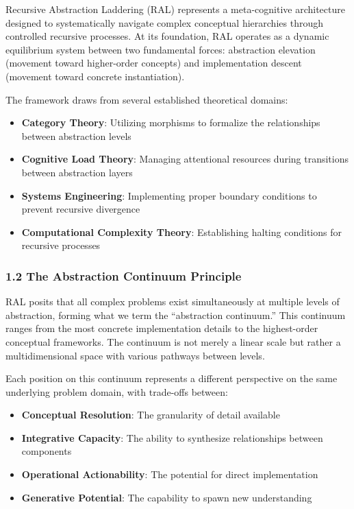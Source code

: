 \documentclass[
]{article}
\providecommand{\tightlist}{%
  \setlength{\itemsep}{0pt}\setlength{\parskip}{0pt}}
\begin{document}
Recursive Abstraction Laddering (RAL) represents a meta-cognitive
architecture designed to systematically navigate complex conceptual
hierarchies through controlled recursive processes. At its foundation,
RAL operates as a dynamic equilibrium system between two fundamental
forces: abstraction elevation (movement toward higher-order concepts)
and implementation descent (movement toward concrete instantiation).

The framework draws from several established theoretical domains:

\begin{itemize}
\tightlist
\item
  \textbf{Category Theory}: Utilizing morphisms to formalize the
  relationships between abstraction levels
\item
  \textbf{Cognitive Load Theory}: Managing attentional resources during
  transitions between abstraction layers
\item
  \textbf{Systems Engineering}: Implementing proper boundary conditions
  to prevent recursive divergence
\item
  \textbf{Computational Complexity Theory}: Establishing halting
  conditions for recursive processes
\end{itemize}

\subsubsection{1.2 The Abstraction Continuum
Principle}\label{the-abstraction-continuum-principle}

RAL posits that all complex problems exist simultaneously at multiple
levels of abstraction, forming what we term the ``abstraction
continuum.'' This continuum ranges from the most concrete implementation
details to the highest-order conceptual frameworks. The continuum is not
merely a linear scale but rather a multidimensional space with various
pathways between levels.

Each position on this continuum represents a different perspective on
the same underlying problem domain, with trade-offs between:

\begin{itemize}
\tightlist
\item
  \textbf{Conceptual Resolution}: The granularity of detail available
\item
  \textbf{Integrative Capacity}: The ability to synthesize relationships
  between components
\item
  \textbf{Operational Actionability}: The potential for direct
  implementation
\item
  \textbf{Generative Potential}: The capability to spawn new
  understanding
\end{itemize}
\end{document}
